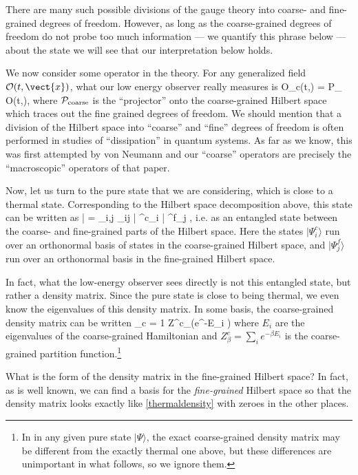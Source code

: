 There are many such possible divisions of the gauge theory into coarse- and fine-grained degrees of freedom. However, as long as the coarse-grained degrees of freedom do not probe too much information --- we quantify this phrase below ---  about the state we will see that our interpretation below holds. 

We now consider some operator in the theory. For any generalized field ${\cal O}(t, \vect{x})$, what our low energy observer really measures is
\be
\label{coarseprojector}
{\cal O}_{c}(t,) = {\cal P}_{} {\cal O}(t,),
\ee
where ${\cal P}_{\text{coarse}}$ is the ``projector'' onto the coarse-grained Hilbert space which traces out the fine grained degrees of freedom. We should mention that a division of the Hilbert space into ``coarse'' and ``fine'' degrees of freedom is often
performed in studies of ``dissipation'' in quantum systems. As far as we know, this was first attempted by von Neumann \cite{von2010proof} and our ``coarse'' operators are precisely the ``macroscopic'' operators of that paper. 

Now, let us turn to the pure state that we are considering, which is close to a thermal state. Corresponding to the Hilbert space decomposition above,  this state can be written as
\be
\label{entangledcoarsefine}
| \Psi \rangle = \sum_{i,j} \alpha_{ij} | \Psi^{c}_i \rangle \otimes | \Psi^{f}_j \rangle,
\ee
i.e. as an entangled state between the coarse- and fine-grained parts of the Hilbert space. Here the states $|\Psi^{c}_i\rangle$ run over an orthonormal basis of states in the coarse-grained Hilbert space, and $|\Psi^{f}_j\rangle$ run over
an orthonormal basis in the fine-grained Hilbert space.

In fact, what the low-energy observer sees directly is not
this entangled state, but rather a density matrix. Since the pure state is close to being thermal, we even know the eigenvalues of this density matrix. In some basis, the coarse-grained density matrix can be written
\be
\label{thermaldensity}
\rho_{c} = {1 \over Z^c_{\beta}}\left(e^{-\beta E_i} \right)
\ee
where $E_i$ are the eigenvalues of the coarse-grained Hamiltonian and $Z^c_{\beta} = \sum_i e^{-\beta E_i}$ is the coarse-grained partition function.\footnote{
 In in any given pure state $|\Psi \rangle$, the exact coarse-grained density matrix may be different from the exactly thermal one above, but these differences are unimportant in what follows, so we ignore them.}


What is the form of the density matrix in the fine-grained Hilbert space? In fact, as is well known, we can find a basis for the {\em fine-grained} Hilbert space so that the density matrix looks exactly like \eqref{thermaldensity} with zeroes in the other places. 

